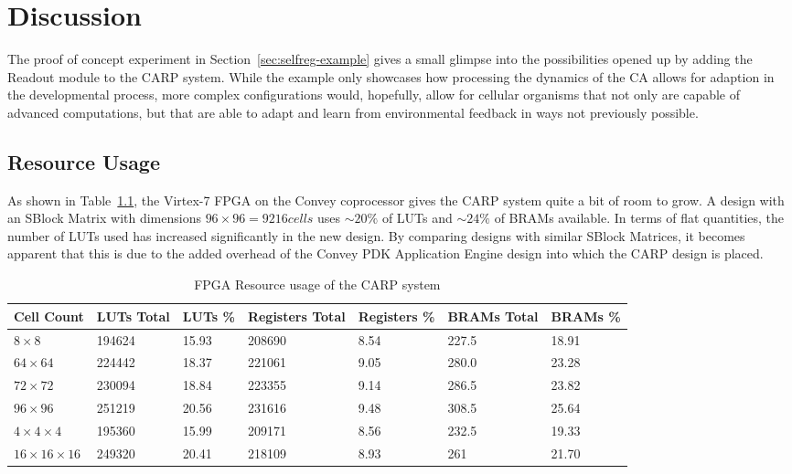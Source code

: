 \chapter{Discussion}

The proof of concept experiment in Section~\ref{sec:selfreg-example} gives a
small glimpse into the possibilities opened up by adding the Readout module
to the CARP system. While the example only showcases how processing the dynamics
of the CA allows for adaption in the developmental process, more complex
configurations would, hopefully, allow for cellular organisms that not only are
capable of advanced computations, but that are able to adapt and learn from
environmental feedback in ways not previously possible.

\section{Resource Usage}

As shown in Table~\ref{tbl:resource-usage}, the Virtex-7 FPGA on the Convey
coprocessor gives the CARP system quite a bit of room to grow. A design with an
SBlock Matrix with dimensions $96\times96 = 9216 cells$ uses $\sim 20\%$ of LUTs
and $\sim 24\%$ of BRAMs available. In terms of flat quantities, the number
of LUTs used has increased significantly in the new design. By comparing designs
with similar SBlock Matrices, it becomes apparent that this is due to the added
overhead of the Convey PDK Application Engine design into which the CARP design
is placed.


\renewcommand{\arraystretch}{1.2}
\begin{table}[ht]
  \centering
  \begin{tabularx}{\linewidth}{X|X|X|X|X|X|X}
    Cell Count & LUTs Total & LUTs \% & Registers Total & Registers \% & BRAMs Total & BRAMs \%\\
    \hline
    $8\times8$ & 194624 & 15.93 & 208690 & 8.54 & 227.5 & 18.91\\ 
    \hline
    $64\times64$ & 224442 & 18.37 & 221061 & 9.05 & 280.0 & 23.28\\
    \hline
    $72\times72$ & 230094 & 18.84 & 223355 & 9.14 & 286.5 & 23.82\\
    \hline
    $96\times96$ & 251219 & 20.56 & 231616 & 9.48 & 308.5 & 25.64\\
    \hline
    $4\times4\times4$ & 195360 & 15.99 & 209171 & 8.56 & 232.5 & 19.33\\
    \hline
    $16\times16\times16$ & 249320 & 20.41 & 218109 & 8.93 & 261 & 21.70\\
  \end{tabularx}
  \caption{FPGA Resource usage of the CARP system}\label{tbl:resource-usage}
\end{table}

